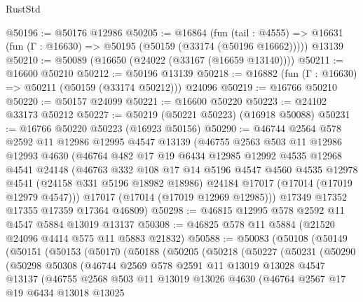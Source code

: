\begin{lexlean}{RustStd}
\begin{coremodule}
{\begin{coremodule}
{{{{{{{{{{{{{{{{{{{{{{{{{{{{{{{{{{{{{{{{{{{{{{{{{{{{{{{@50196 := @50176 @12986
@50205 := @16864
    (fun (tail : @4555) => @16631 (fun (Γ : @16630) => @50195 (@50159 (@33174 (@50196 @16662)))))
    @13139
@50210 := @50089 (@16650 (@24022 (@33167 (@16659 @13140))))
@50211 := @16600 @50210
@50212 := @50196 @13139
@50218 := @16882 (fun (Γ : @16630) => @50211 (@50159 (@33174 @50212))) @24096
@50219 := @16766 @50210
@50220 := @50157 @24099
@50221 := @16600 @50220
@50223 := @24102 @33173 @50212
@50227 := @50219 (@50221 @50223) (@16918 @50088)
@50231 := @16766 @50220 @50223 (@16923 @50156)
@50290 := @46744
    @2564
    @578
    @2592
    @11
    @12986
    @12995
    @4547
    @13139
    (@46755
      @2563
      @503
      @11
      @12986
      @12993
      @4630
      (@46764
        @482
        @17
        @19
        @6434
        @12985
        @12992
        @4535
        @12968
        @4541
        @24148
        (@46763
          @332
          @108
          @17
          @14
          @5196
          @4547
          @4560
          @4535
          @12978
          @4541
          (@24158 @331 @5196 @18982 @18986)
          @24184
          @17017
          (@17014 (@17019 @12979 @4547)))
        @17017
        (@17014 (@17019 @12969 @12985)))
      @17349
      @17352
      @17355
      @17359
      @17364
      @46809)
@50298 := @46815 @12995 @578 @2592 @11 @4547 @5884 @13019 @13137
@50308 := @46825 @578 @11 @5884 (@21520 @24096 @4414 @575 @11 @5883 @21832)
@50588 := @50083
    (@50108
      (@50149
        (@50151
          (@50153
            (@50170
              (@50188
                (@50205
                  (@50218
                    (@50227
                      (@50231
                        (@50290
                          (@50298
                            @50308
                            (@46744
                              @2569
                              @578
                              @2591
                              @11
                              @13019
                              @13028
                              @4547
                              @13137
                              (@46755
                                @2568
                                @503
                                @11
                                @13019
                                @13026
                                @4630
                                (@46764
                                  @2567
                                  @17
                                  @19
                                  @6434
                                  @13018
                                  @13025
}}}}}}}}}}}}}}}}}}}}}}}}}}}}}}}}}}}}}}}}}}}}}}}}}}}}}}}
\end{coremodule}}
\end{coremodule}
\end{lexlean}
